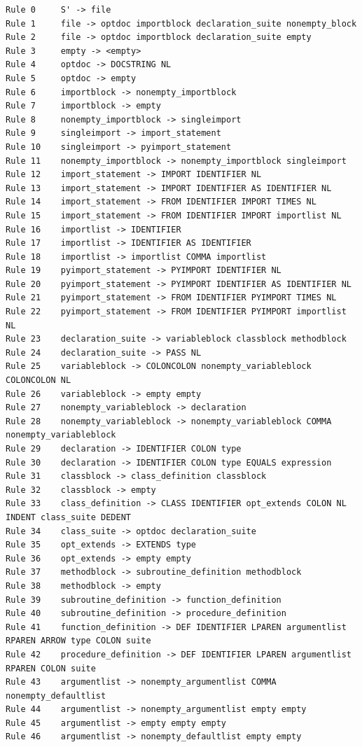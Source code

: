 \documentclass{article}
\begin{document}
\begin{verbatim}
Rule 0     S' -> file
Rule 1     file -> optdoc importblock declaration_suite nonempty_block
Rule 2     file -> optdoc importblock declaration_suite empty
Rule 3     empty -> <empty>
Rule 4     optdoc -> DOCSTRING NL
Rule 5     optdoc -> empty
Rule 6     importblock -> nonempty_importblock
Rule 7     importblock -> empty
Rule 8     nonempty_importblock -> singleimport
Rule 9     singleimport -> import_statement
Rule 10    singleimport -> pyimport_statement
Rule 11    nonempty_importblock -> nonempty_importblock singleimport
Rule 12    import_statement -> IMPORT IDENTIFIER NL
Rule 13    import_statement -> IMPORT IDENTIFIER AS IDENTIFIER NL
Rule 14    import_statement -> FROM IDENTIFIER IMPORT TIMES NL
Rule 15    import_statement -> FROM IDENTIFIER IMPORT importlist NL
Rule 16    importlist -> IDENTIFIER
Rule 17    importlist -> IDENTIFIER AS IDENTIFIER
Rule 18    importlist -> importlist COMMA importlist
Rule 19    pyimport_statement -> PYIMPORT IDENTIFIER NL
Rule 20    pyimport_statement -> PYIMPORT IDENTIFIER AS IDENTIFIER NL
Rule 21    pyimport_statement -> FROM IDENTIFIER PYIMPORT TIMES NL
Rule 22    pyimport_statement -> FROM IDENTIFIER PYIMPORT importlist NL
Rule 23    declaration_suite -> variableblock classblock methodblock
Rule 24    declaration_suite -> PASS NL
Rule 25    variableblock -> COLONCOLON nonempty_variableblock COLONCOLON NL
Rule 26    variableblock -> empty empty
Rule 27    nonempty_variableblock -> declaration
Rule 28    nonempty_variableblock -> nonempty_variableblock COMMA nonempty_variableblock
Rule 29    declaration -> IDENTIFIER COLON type
Rule 30    declaration -> IDENTIFIER COLON type EQUALS expression
Rule 31    classblock -> class_definition classblock
Rule 32    classblock -> empty
Rule 33    class_definition -> CLASS IDENTIFIER opt_extends COLON NL INDENT class_suite DEDENT
Rule 34    class_suite -> optdoc declaration_suite
Rule 35    opt_extends -> EXTENDS type
Rule 36    opt_extends -> empty empty
Rule 37    methodblock -> subroutine_definition methodblock
Rule 38    methodblock -> empty
Rule 39    subroutine_definition -> function_definition
Rule 40    subroutine_definition -> procedure_definition
Rule 41    function_definition -> DEF IDENTIFIER LPAREN argumentlist RPAREN ARROW type COLON suite
Rule 42    procedure_definition -> DEF IDENTIFIER LPAREN argumentlist RPAREN COLON suite
Rule 43    argumentlist -> nonempty_argumentlist COMMA nonempty_defaultlist
Rule 44    argumentlist -> nonempty_argumentlist empty empty
Rule 45    argumentlist -> empty empty empty
Rule 46    argumentlist -> nonempty_defaultlist empty empty

\end{verbatim}
\end{document}
